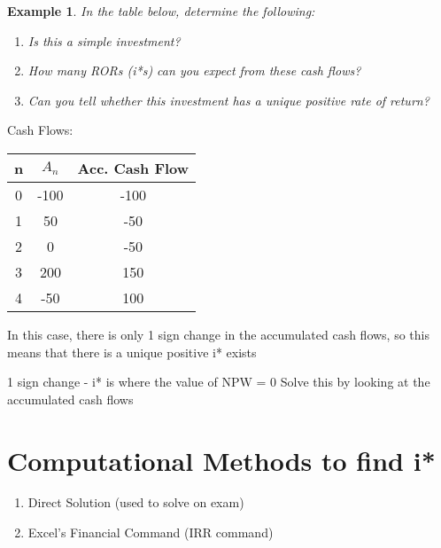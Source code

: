 \documentclass{report} %
\newtheorem{exmp}{Example}
\begin{document}
\begin{exmp}
    In the table below, determine the following:
    \begin{enumerate}
        \item Is this a simple investment?
        \item How many RORs (i*s) can you expect from these cash flows?
        \item Can you tell whether this investment has a unique positive rate of return? 
    \end{enumerate}
\end{exmp}
Cash Flows:
\begin{center}
    \begin{tabular}{c c c}
        n & $A_n$ & Acc. Cash Flow \\
        \hline
        0 & -100 & -100\\
        1 & 50  & -50\\
        2 & 0  & -50 \\
        3 & 200 & 150\\ 
        4 & -50 & 100\\ 
    \end{tabular}
\end{center}
In this case, there is only 1 sign change in the accumulated cash flows, so this means that there is a unique positive i* exists

1 sign change - i* is where the value of NPW = 0 
Solve this by looking at the accumulated cash flows

\section*{Computational Methods to find i*}
\begin{enumerate}
    \item Direct Solution (used to solve on exam)
    \item Excel's Financial Command (IRR command)
\end{enumerate}
\end{document}
